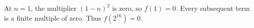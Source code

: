 At $n=1$, the multiplier $(1-n)^2$ is zero, so $f(1)=0$. Every subsequent term is a finite multiple of zero. Thus $\boxed{f(2^{16})=0}$.
